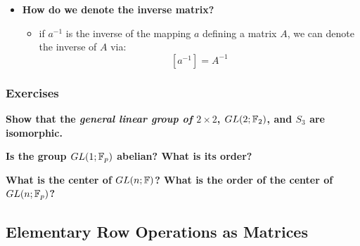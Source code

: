 \documentclass{exam}
\begin{document}
\begin{itemize}
\begin{itemize}
\begin{proof}
\begin{itemize}
            \[
            dim(\F^n) = dim(im(a)) + dim(ker(a))
            \]
            Since $dim(im(a)) = dim(\F^n)$, we must have that $dim(ker(a)) = 0$, so it follows that $a$ is also injective.
            Hence, $a$ must be an isomorphism, so $A$ must be invertible.
        \end{itemize}
        \end{proof}
    \end{itemize}
    \item \textbf{How do we denote the inverse matrix?}
    \begin{itemize}
        \item if $a^{-1}$ is the inverse of the mapping $a$ defining a matrix $A$, we can denote the inverse of $A$ via:
        \[
        [a^{-1}] = A^{-1}
        \]
    \end{itemize}
\end{itemize}

\subsubsection{Exercises}

\begin{questions}

\question \textbf{Show that the \textit{general linear group of $2 \times 2$}, $GL(2;\mathbb{F}_2)$, and $S_3$ are isomorphic.}

\question \textbf{Is the group $GL(1;\mathbb{F}_p)$ abelian? What is its order?}

\question \textbf{What is the center of $GL(n;\mathbb{F})$? What is the order of the center of $GL(n;\mathbb{F}_p)$?}

\end{questions}

\subsection{Elementary Row Operations as Matrices}
\end{document}
